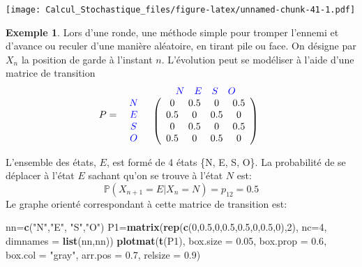 \documentclass[
]{book}
\newenvironment{Shaded}{\begin{snugshade}}{\end{snugshade}}
\newcommand{\DataTypeTok}[1]{\textcolor[rgb]{0.13,0.29,0.53}{#1}}
\newcommand{\DecValTok}[1]{\textcolor[rgb]{0.00,0.00,0.81}{#1}}
\newcommand{\FloatTok}[1]{\textcolor[rgb]{0.00,0.00,0.81}{#1}}
\newcommand{\KeywordTok}[1]{\textcolor[rgb]{0.13,0.29,0.53}{\textbf{#1}}}
\newcommand{\NormalTok}[1]{#1}
\newcommand{\StringTok}[1]{\textcolor[rgb]{0.31,0.60,0.02}{#1}}
\theoremstyle{definition}
\theoremstyle{definition}
\newtheorem{example}{Exemple}[chapter]
\theoremstyle{definition}
\theoremstyle{remark}
\begin{document}
\texttt{[image: Calcul\_Stochastique\_files/figure-latex/unnamed-chunk-41-1.pdf]}

\begin{example}
\protect\hypertarget{exm:unnamed-chunk-42}{}{\label{exm:unnamed-chunk-42} }Lors d'une ronde, une méthode simple pour tromper l'ennemi et d'avance ou reculer d'une manière aléatoire, en tirant pile ou face. On désigne par \(X_n\) la position de garde à l'instant \(n\). L'évolution peut se modéliser à l'aide d'une matrice de transition
\[
 P=\begin{array}{c c} &
\begin{array}{c c c c} \color{blue}{N} & \color{blue}{E} & \color{blue}{S} & \color{blue}{O} \\
\end{array}
\\
\begin{array}{c c c c}
\color{blue}{N} \\
\color{blue}{E}\\
\color{blue}{S} \\
\color{blue}{O}
\end{array}
&
\left(
\begin{array}{c c c c}
0 & 0.5 & 0 & 0.5 \\
0.5 & 0 & 0.5 & 0 \\
0 & 0.5 & 0 & 0.5 \\
0.5 & 0 & 0.5 & 0
\end{array}
\right)
\end{array}\]
\end{example}

L'ensemble des états, \(E\), est formé de 4 états \{N, E, S, O\}. La probabilité de se déplacer à l'état \(E\) sachant qu'on se trouve à l'état \(N\) est:
\[
\mathbb{P}(X_{n+1}=E|X_n=N)=p_{12}=0.5
\]
Le graphe orienté correspondant à cette matrice de transition est:

\begin{Shaded}
\begin{Highlighting}[]
\NormalTok{nn=}\KeywordTok{c}\NormalTok{(}\StringTok{"N"}\NormalTok{,}\StringTok{"E"}\NormalTok{, }\StringTok{"S"}\NormalTok{,}\StringTok{"O"}\NormalTok{)}
\NormalTok{P1=}\KeywordTok{matrix}\NormalTok{(}\KeywordTok{rep}\NormalTok{(}\KeywordTok{c}\NormalTok{(}\DecValTok{0}\NormalTok{,}\FloatTok{0.5}\NormalTok{,}\DecValTok{0}\NormalTok{,}\FloatTok{0.5}\NormalTok{,}\FloatTok{0.5}\NormalTok{,}\DecValTok{0}\NormalTok{,}\FloatTok{0.5}\NormalTok{,}\DecValTok{0}\NormalTok{),}\DecValTok{2}\NormalTok{), }\DataTypeTok{nc=}\DecValTok{4}\NormalTok{,}
          \DataTypeTok{dimnames =} \KeywordTok{list}\NormalTok{(nn,nn))}
\KeywordTok{plotmat}\NormalTok{(}\KeywordTok{t}\NormalTok{(P1), }\DataTypeTok{box.size =} \FloatTok{0.05}\NormalTok{, }\DataTypeTok{box.prop =} \FloatTok{0.6}\NormalTok{, }\DataTypeTok{box.col =} \StringTok{"gray"}\NormalTok{, }
          \DataTypeTok{arr.pos =} \FloatTok{0.7}\NormalTok{, }\DataTypeTok{relsize =} \FloatTok{0.9}\NormalTok{)}
\end{Highlighting}
\end{Shaded}
\end{document}
